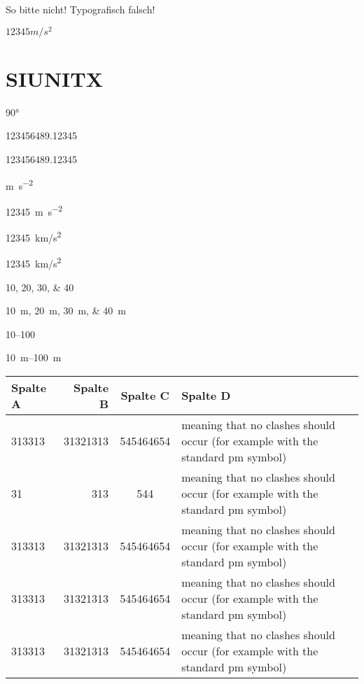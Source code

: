 \documentclass[12pt,ngerman]{scrartcl}
\begin{document}
So bitte nicht! Typografisch falsch!

$12345 m/s^2$

\section{SIUNITX}

\ang{90}

\num{123456489,12345}

\num{123456489.12345}

\unit{\meter\per\square\second}

\qty[per-mode = fraction]{12345}{\meter\per\square\second}

\qty[per-mode = fraction]{12345}{\kilo m/s^2}

\qty[per-mode = fraction]{12345}{km/s^2}

\numlist{10;20;30;40}

\qtylist{10;20;30;40}{\meter}

\numrange{10}{100}

\qtyrange{10}{100}{\meter}


\begin{tabular}{|l|r|c|p{10cm}|} \hline
Spalte A & Spalte B & Spalte C & Spalte D \\ \hline
313313 & 31321313 & 545464654 & meaning that no clashes should occur (for example with the standard pm symbol) \\ \hline
31 & 313 & 544 & meaning that no clashes should occur (for example with the standard pm symbol)  \\ \hline
313313 & 31321313 & 545464654 & meaning that no clashes should occur (for example with the standard pm symbol)  \\ \hline
313313 & 31321313 & 545464654 & meaning that no clashes should occur (for example with the standard pm symbol)  \\ \hline
313313 & 31321313 & 545464654 & meaning that no clashes should occur (for example with the standard pm symbol)  \\ \hline
\end{tabular}
\end{document}
